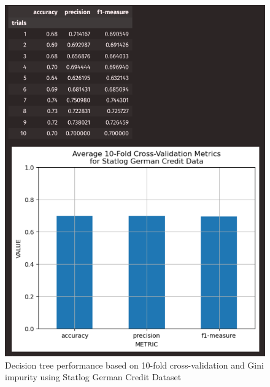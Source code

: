 \documentclass{article}
\begin{document}
    \begin{figure}[H]
        \centering
        \begin{minipage}[t]{0.47\textwidth}
            \centering
            \includegraphics[width=\textwidth, height=0.35\textheight]{1cg.png}
            \caption{Decision tree performance based on 10-fold cross-validation and Gini impurity using Statlog German Credit Dataset}
        \end{minipage}
        \hfill
        \begin{minipage}[t]{0.47\textwidth}
            \centering

\end{minipage}
\end{figure}
\end{document}
